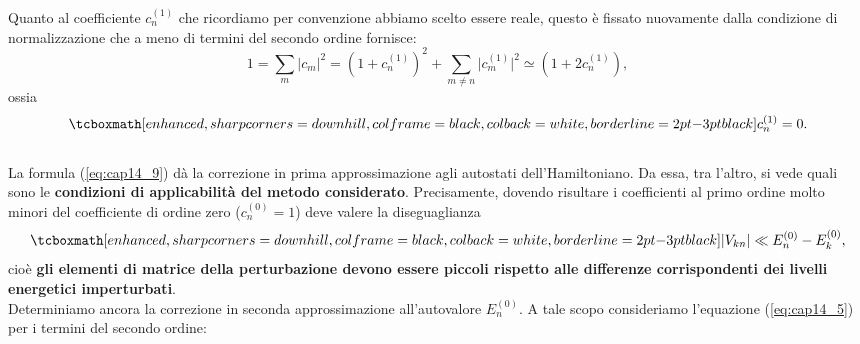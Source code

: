 Quanto al coefficiente $c_n ^{(1)}$ che ricordiamo per convenzione abbiamo scelto essere reale, questo è fissato nuovamente dalla condizione di normalizzazione che a meno di termini del secondo ordine fornisce:
	\begin{equation}
		1= \sum _m \vert c_m \vert ^2 = \left( 1+ c_n ^{(1)}\right) ^2+ \sum _{m\neq n } \vert c_m ^{(1)} \vert ^2 \simeq \left( 1+ 2c_n ^{(1)}\right),
	\end{equation}
ossia
	\begin{equation}
		\tcboxmath[enhanced, sharp corners=downhill, colframe=black, colback=white, borderline={2pt}{-3pt}{black}]{
			c_n ^{(1)} =0.
			}
	\label{eq:cap14_10}
	\end{equation}\\
	
La formula (\ref{eq:cap14_9}) dà la correzione in prima approssimazione agli autostati dell'Hamiltoniano. Da essa, tra l'altro, si vede quali sono le \textbf{condizioni di applicabilità del metodo considerato}. Precisamente, dovendo risultare i coefficienti al primo ordine molto minori del coefficiente di ordine zero ($c_n ^{(0)} =1$) deve valere la diseguaglianza
	\begin{equation}
		\tcboxmath[enhanced, sharp corners=downhill, colframe=black, colback=white, borderline={2pt}{-3pt}{black}]{
			\vert V_{kn} \vert \ll E_ n ^{(0)}-E_ k ^{(0)},
		}
	\end{equation}
cioè \textbf{gli elementi di matrice della perturbazione devono essere piccoli rispetto alle differenze corrispondenti dei livelli energetici imperturbati}.\\

Determiniamo ancora la correzione in seconda approssimazione all'autovalore $E_n ^{(0)}$. A tale scopo consideriamo l'equazione (\ref{eq:cap14_5}) per i termini del secondo ordine:\\

